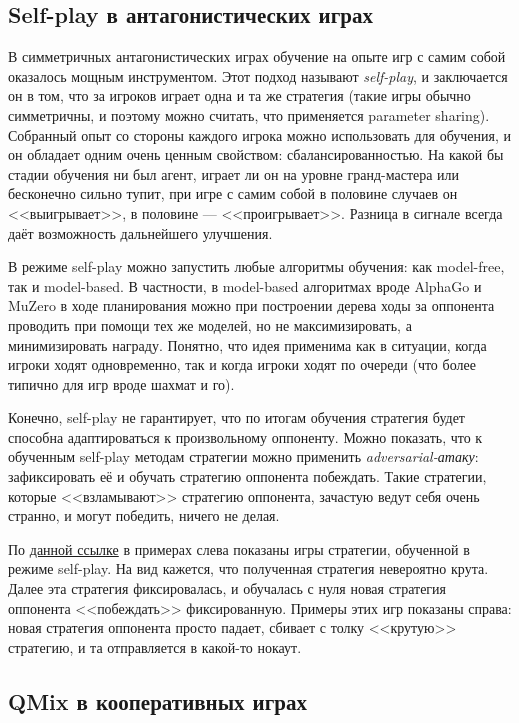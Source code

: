 \subsection{Self-play в антагонистических играх}

В симметричных антагонистических играх обучение на опыте игр с самим собой оказалось мощным инструментом. Этот подход называют \emph{self-play}, и заключается он в том, что за игроков играет одна и та же стратегия (такие игры обычно симметричны, и поэтому можно считать, что применяется parameter sharing). Собранный опыт со стороны каждого игрока можно использовать для обучения, и он обладает одним очень ценным свойством: сбалансированностью. На какой бы стадии обучения ни был агент, играет ли он на уровне гранд-мастера или бесконечно сильно тупит, при игре с самим собой в половине случаев он <<выигрывает>>, в половине --- <<проигрывает>>. Разница в сигнале всегда даёт возможность дальнейшего улучшения.

В режиме self-play можно запустить любые алгоритмы обучения: как model-free, так и model-based. В частности, в model-based алгоритмах вроде AlphaGo и MuZero в ходе планирования можно при построении дерева ходы за оппонента проводить при помощи тех же моделей, но не максимизировать, а минимизировать награду. Понятно, что идея применима как в ситуации, когда игроки ходят одновременно, так и когда игроки ходят по очереди (что более типично для игр вроде шахмат и го).

Конечно, self-play не гарантирует, что по итогам обучения стратегия будет способна адаптироваться к произвольному оппоненту. Можно показать, что к обученным self-play методам стратегии можно применить \emph{adversarial-атаку}: зафиксировать её и обучать стратегию оппонента побеждать. Такие стратегии, которые <<взламывают>> стратегию оппонента, зачастую ведут себя очень странно, и могут победить, ничего не делая.

\begin{example}
По \href{https://adversarialpolicies.github.io/}{данной ссылке} в примерах слева показаны игры стратегии, обученной в режиме self-play. На вид кажется, что полученная стратегия невероятно крута. Далее эта стратегия фиксировалась, и обучалась с нуля новая стратегия оппонента <<побеждать>> фиксированную. Примеры этих игр показаны справа: новая стратегия оппонента просто падает, сбивает с толку <<крутую>> стратегию, и та отправляется в какой-то нокаут.
\end{example}

\subsection{QMix в кооперативных играх}

